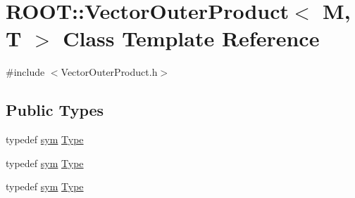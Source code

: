 \hypertarget{classROOT_1_1Minuit2_1_1VectorOuterProduct}{}\section{R\+O\+OT\+:\+:Vector\+Outer\+Product$<$ M, T $>$ Class Template Reference}
\label{classROOT_1_1Minuit2_1_1VectorOuterProduct}


{\ttfamily \#include $<$Vector\+Outer\+Product.\+h$>$}

\subsection*{Public Types}
\begin{DoxyCompactItemize}
\item 
typedef \mbox{\hyperlink{classROOT_1_1Minuit2_1_1sym}{sym}} \mbox{\hyperlink{classROOT_1_1Minuit2_1_1VectorOuterProduct_aea9ef9ec90fc733d5bac6abfbf96b60e}{Type}}
\item 
typedef \mbox{\hyperlink{classROOT_1_1Minuit2_1_1sym}{sym}} \mbox{\hyperlink{classROOT_1_1Minuit2_1_1VectorOuterProduct_aea9ef9ec90fc733d5bac6abfbf96b60e}{Type}}
\item 
typedef \mbox{\hyperlink{classROOT_1_1Minuit2_1_1sym}{sym}} \mbox{\hyperlink{classROOT_1_1Minuit2_1_1VectorOuterProduct_aea9ef9ec90fc733d5bac6abfbf96b60e}{Type}}
\end{DoxyCompactItemize}

